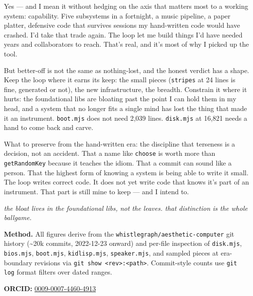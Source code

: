 \documentclass[10pt,letterpaper,twocolumn]{article}
\newcommand{\pull}[1]{%
  \par\vspace{0.4em}
  {\aclight\small\color{acpink}\itshape #1}\par
  \vspace{0.4em}}
\begin{document}
Yes --- and I mean it without hedging on the axis that matters most to a working system: capability. Five subsystems in a fortnight, a music pipeline, a paper platter, defensive code that survives sessions my hand-written code would have crashed. I'd take that trade again. The loop let me build things I'd have needed years and collaborators to reach. That's real, and it's most of why I picked up the tool.

But better-off is not the same as nothing-lost, and the honest verdict has a shape. Keep the loop where it earns its keep: the small pieces (\texttt{stripes} at 24 lines is fine, generated or not), the new infrastructure, the breadth. Constrain it where it hurts: the foundational libs are bloating past the point I can hold them in my head, and a system that no longer fits a single mind has lost the thing that made it an instrument. \texttt{boot.mjs} does not need 2,039 lines. \texttt{disk.mjs} at 16,821 needs a hand to come back and carve.

What to preserve from the hand-written era: the discipline that terseness is a decision, not an accident. That a name like \texttt{choose} is worth more than \texttt{getRandomKey} because it teaches the idiom. That a commit can sound like a person. That the highest form of knowing a system is being able to write it small. The loop writes correct code. It does not yet write code that knows it's part of an instrument. That part is still mine to keep --- and I intend to.

\pull{the bloat lives in the foundational libs, not the leaves. that distinction is the whole ballgame.}

\vspace{0.5em}
\noindent\textbf{Method.} All figures derive from the \texttt{whistlegraph/aesthetic-computer} git history (\textasciitilde20k commits, 2022-12-23 onward) and per-file inspection of \texttt{disk.mjs}, \texttt{bios.mjs}, \texttt{boot.mjs}, \texttt{kidlisp.mjs}, \texttt{speaker.mjs}, and sampled pieces at era-boundary revisions via \texttt{git show <rev>:<path>}. Commit-style counts use \texttt{git log} format filters over dated ranges.

\vspace{0.5em}
\noindent\textbf{ORCID:} \href{https://orcid.org/0009-0007-4460-4913}{0009-0007-4460-4913}




\end{document}
